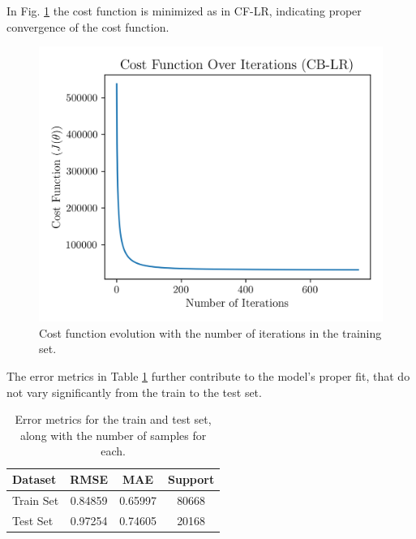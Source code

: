 \documentclass[conference]{IEEEtran}
\begin{document}

In Fig. \ref{fig:model02_cost_function} the cost function is minimized as in CF-LR, indicating proper convergence of the cost function.


\begin{figure}[H]
    \centering
    \includegraphics[width=1\linewidth]{assets/model02_cost_function.png}
    \caption{Cost function evolution with the number of iterations in the training set.}
    \label{fig:model02_cost_function}
\end{figure}



The error metrics in Table \ref{tab:model03_results} further contribute to the model's proper fit, that do not vary significantly from the train to the test set.


\begin{table}[H]
\centering
\caption{Error metrics for the train and test set, along with the number of samples for each.}
\label{tab:model03_results}
\begin{tabular}{lccc}
\toprule
\textbf{Dataset} & \textbf{RMSE} & \textbf{MAE} & \textbf{Support} \\
\midrule
Train Set & 0.84859 & 0.65997 & 80668 \\
Test Set & 0.97254 & 0.74605 & 20168 \\
\bottomrule
\end{tabular}
\end{table}
\end{document}
